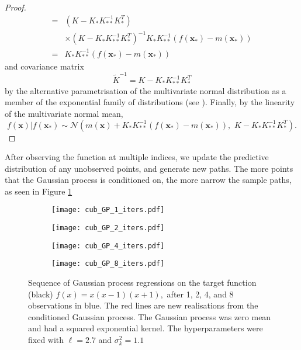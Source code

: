\begin{proof}
\begin{align*}
        = & (K - K_{*} K_{**}^{-1} K_{*}^T)                              \\
          & \times(K - K_{*} K_{**}^{-1} K_{*}^T)^{-1} K_{*} K_{**}^{-1}
        (f(\mathbf{x}_*) - m(\mathbf{x}_*))                              \\
        = & K_{*} K_{**}^{-1}(f(\mathbf{x}_*) - m(\mathbf{x}_*))
    \end{align*}
    and covariance matrix
    $$
        \tilde{K}^{-1} = K - K_{*} K_{**}^{-1} K_{*}^T
    $$
    by the alternative parametrisation of the multivariate normal distribution
    as a member of the exponential family of distributions
    (see \cite[Table of Distributions]{noauthor_exponential_2024}).
    Finally, by the linearity of the multivariate normal mean,
    $$
        f(\mathbf{x}) | f(\mathbf{x}_*)
        \sim \mathcal{N}\left(
        m(\mathbf{x}) + K_{*}K_{**}^{-1}(f(\mathbf{x}_*) - m(\mathbf{x}_*)), \,\,
        K - K_{*}K_{**}^{-1}K_{*}^T
        \right).
    $$
\end{proof}

After observing the function at multiple indices, we update the
predictive distribution of any unobserved points, and generate new paths. The
more points that the Gaussian process is conditioned on, the more narrow the
sample paths, as seen in Figure \ref{fig:no_var_cub_reg}

\begin{figure}[htbp]
    \centering
    \begin{subfigure}[b]{0.5\textwidth}
        \centering
        \texttt{[image: cub\_GP\_1\_iters.pdf]}
    \end{subfigure}%
    \hfill%
    \begin{subfigure}[b]{0.5\textwidth}
        \centering
        \texttt{[image: cub\_GP\_2\_iters.pdf]}
    \end{subfigure}
    \begin{subfigure}[b]{0.5\textwidth}
        \centering
        \texttt{[image: cub\_GP\_4\_iters.pdf]}
    \end{subfigure}%
    \hfill%
    \begin{subfigure}[b]{0.5\textwidth}
        \centering
        \texttt{[image: cub\_GP\_8\_iters.pdf]}
    \end{subfigure}%
    \caption{
        Sequence of Gaussian process regressions on the target function
        (black) $f(x) = x(x-1)(x+1),$ after 1, 2, 4, and 8 observations in
        blue. The red lines are new realisations from the conditioned Gaussian
        process. The Gaussian process was zero mean and had a squared
        exponential kernel. The hyperparameters were fixed with $\ell = 2.7$
        and $\sigma^2_k = 1.1$
    }
    \label{fig:no_var_cub_reg}
\end{figure}

